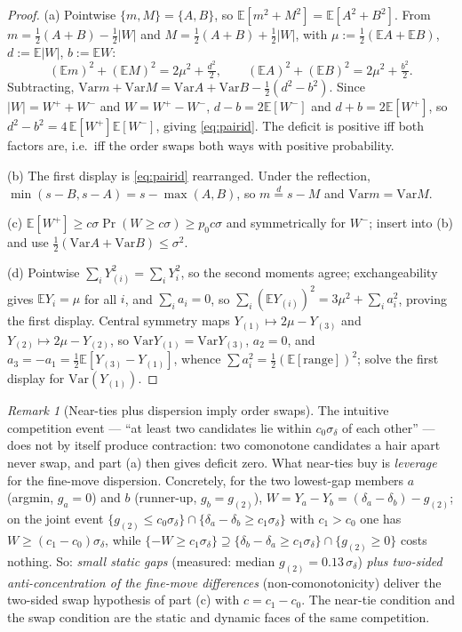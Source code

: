 \documentclass[11pt]{article}
\theoremstyle{definition}
\theoremstyle{remark}
\newtheorem{remark}[theorem]{Remark}
\newcommand{\E}{\mathbb{E}}
\newcommand{\Var}{\mathrm{Var}}
\newcommand{\dl}{\delta}
\begin{document}
\begin{proof}
(a) Pointwise $\{m, M\} = \{A, B\}$, so $\E[m^2 + M^2] = \E[A^2 + B^2]$.
From $m = \tfrac12(A+B) - \tfrac12|W|$ and $M = \tfrac12(A+B) +
\tfrac12|W|$, with $\mu := \tfrac12(\E A + \E B)$, $d := \E|W|$,
$b := \E W$:
\[
(\E m)^2 + (\E M)^2 = 2\mu^2 + \tfrac{d^2}{2},
\qquad
(\E A)^2 + (\E B)^2 = 2\mu^2 + \tfrac{b^2}{2}.
\]
Subtracting, $\Var m + \Var M = \Var A + \Var B - \tfrac12(d^2 - b^2)$.
Since $|W| = W^+ + W^-$ and $W = W^+ - W^-$,
$d - b = 2\E[W^-]$ and $d + b = 2\E[W^+]$, so
$d^2 - b^2 = 4\,\E[W^+]\E[W^-]$, giving \eqref{eq:pairid}. The deficit is
positive iff both factors are, i.e.\ iff the order swaps both ways with
positive probability.

(b) The first display is \eqref{eq:pairid} rearranged. Under the
reflection, $\min(s - B, s - A) = s - \max(A, B)$, so
$m \overset{d}{=} s - M$ and $\Var m = \Var M$.

(c) $\E[W^+] \geq c\sigma \Pr(W \geq c\sigma) \geq p_0 c \sigma$ and
symmetrically for $W^-$; insert into (b) and use
$\tfrac12(\Var A + \Var B) \leq \sigma^2$.

(d) Pointwise $\sum_i Y_{(i)}^2 = \sum_i Y_i^2$, so the second moments
agree; exchangeability gives $\E Y_i = \mu$ for all $i$, and
$\sum_i a_i = 0$, so $\sum_i (\E Y_{(i)})^2 = 3\mu^2 + \sum_i a_i^2$,
proving the first display. Central symmetry maps
$Y_{(1)} \mapsto 2\mu - Y_{(3)}$ and $Y_{(2)} \mapsto 2\mu - Y_{(2)}$,
so $\Var Y_{(1)} = \Var Y_{(3)}$, $a_2 = 0$, and
$a_3 = -a_1 = \tfrac12 \E[Y_{(3)} - Y_{(1)}]$, whence
$\sum a_i^2 = \tfrac12 (\E[\mathrm{range}])^2$; solve the first display
for $\Var(Y_{(1)})$.
\end{proof}

\begin{remark}[Near-ties plus dispersion imply order swaps]
\label{rem:nearties}
The intuitive competition event --- ``at least two candidates lie within
$c_0 \sigma_\dl$ of each other'' --- does not by itself produce
contraction: two comonotone candidates a hair apart never swap, and part
(a) then gives deficit zero. What near-ties buy is \emph{leverage} for
the fine-move dispersion. Concretely, for the two lowest-gap members $a$
(argmin, $g_a = 0$) and $b$ (runner-up, $g_b = g_{(2)}$),
$W = Y_a - Y_b = (\dl_a - \dl_b) - g_{(2)}$; on the joint event
$\{ g_{(2)} \leq c_0 \sigma_\dl \} \cap
\{ \dl_a - \dl_b \geq c_1 \sigma_\dl \}$ with $c_1 > c_0$ one has
$W \geq (c_1 - c_0)\sigma_\dl$, while
$\{-W \geq c_1 \sigma_\dl\} \supseteq \{\dl_b - \dl_a \geq c_1\sigma_\dl\}
\cap \{g_{(2)} \geq 0\}$ costs nothing. So: \emph{small static gaps}
(measured: median $g_{(2)} = 0.13\,\sigma_\dl$) \emph{plus two-sided
anti-concentration of the fine-move differences} (non-comonotonicity)
deliver the two-sided swap hypothesis of part (c) with $c = c_1 - c_0$.
The near-tie condition and the swap condition are the static and dynamic
faces of the same competition.
\end{remark}
\end{document}
